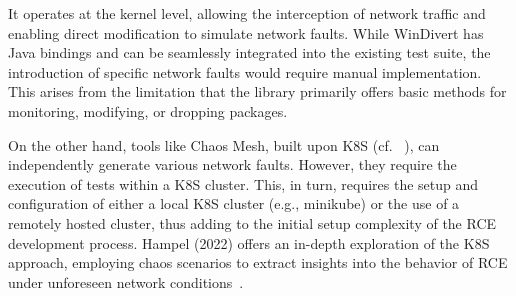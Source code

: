 It operates at the kernel level, allowing the interception of network traffic and enabling direct modification to simulate network faults. While WinDivert has Java bindings and can be seamlessly integrated into the existing test suite, the introduction of specific network faults would require manual implementation. This arises from the limitation that the library primarily offers basic methods for monitoring, modifying, or dropping packages.

On the other hand, tools like Chaos Mesh, built upon \ac{K8S} (cf. ~), can independently generate various network faults. However, they require the execution of tests within a \ac{K8S} cluster. This, in turn, requires the setup and configuration of either a local \ac{K8S} cluster (e.g., minikube) or the use of a remotely hosted cluster, thus adding to the initial setup complexity of the \ac{RCE} development process. Hampel (2022) offers an in-depth exploration of the \ac{K8S} approach, employing chaos scenarios to extract insights into the behavior of \ac{RCE} under unforeseen network conditions~\cite{Hampel2022}.

